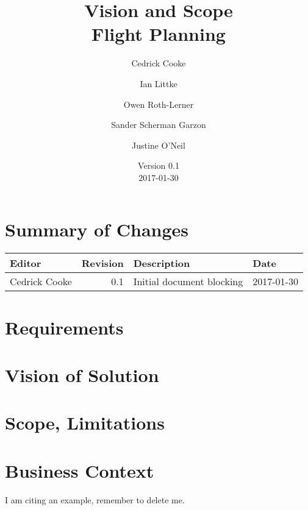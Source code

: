 \documentclass[12pt, letterpaper]{article}
\title{Vision and Scope \\
Flight Planning
}
\author{ Cedrick Cooke
    \and Ian Littke
    \and Owen Roth-Lerner
    \and Sander Scherman Garzon
    \and Justine O'Neil
}
\date{Version 0.1 \\ 2017-01-30}
\begin{document}
\maketitle

\tableofcontents

\section*{Summary of Changes}
\begin{tabularx}{\textwidth}{|l|r|X|l|}
\hline
Editor & Revision & Description & Date \\ \hline \hline
Cedrick Cooke & 0.1 & Initial document blocking & 2017-01-30 \\ \hline
\end{tabularx}

\section{Requirements}

\section{Vision of Solution}

\section{Scope, Limitations}

\section{Business Context}

I am citing an example, remember to delete me\cite{example}.

{}

\end{document}
